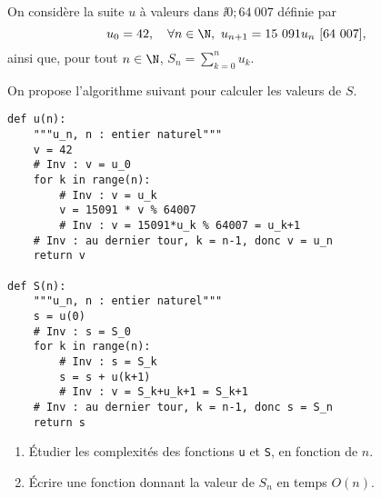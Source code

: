 \exer{}
\setcounter{numques}{0}

  On considère la suite $u$ à valeurs dans $\ii{0;64~007}$ définie par 
  \begin{equation*}
    u_0 = 42,\quad \forall n \in\N,~ u_{n+1} = 15~091 u_n ~[64~007], 
  \end{equation*}
  ainsi que, pour tout $n\in\N$, $S_n = \displaystyle\sum_{k=0}^n u_k$.
  
  On propose l'algorithme suivant pour calculer les valeurs de $S$. 
\begin{lstlisting}
def u(n):
    """u_n, n : entier naturel"""
    v = 42
    # Inv : v = u_0
    for k in range(n):
        # Inv : v = u_k
        v = 15091 * v % 64007
        # Inv : v = 15091*u_k % 64007 = u_k+1
    # Inv : au dernier tour, k = n-1, donc v = u_n
    return v
    
def S(n):
    """u_n, n : entier naturel"""
    s = u(0)
    # Inv : s = S_0
    for k in range(n):
        # Inv : s = S_k
        s = s + u(k+1)
        # Inv : v = S_k+u_k+1 = S_k+1
    # Inv : au dernier tour, k = n-1, donc s = S_n
    return s
\end{lstlisting}
\begin{enumerate}
  \item Étudier les complexités des fonctions \texttt{u} et \texttt{S}, en fonction de $n$.
  \item Écrire une fonction donnant la valeur de $S_n$ en temps $O(n)$. 
\end{enumerate}